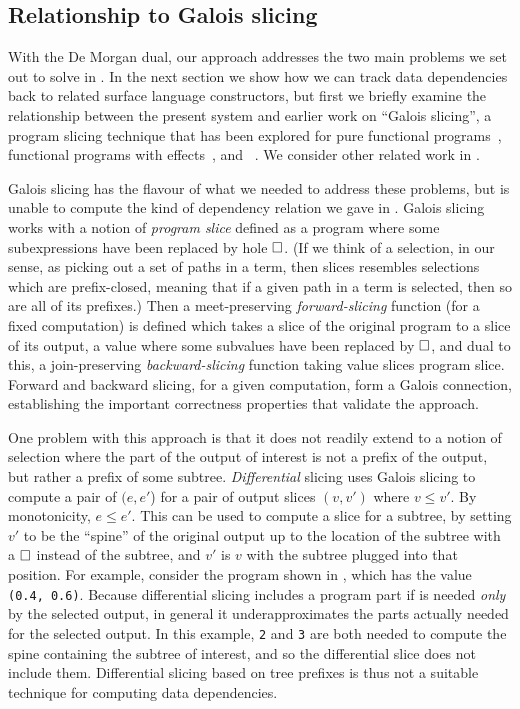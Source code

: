 \subsection{Relationship to Galois slicing}
\label{sec:de-morgan:galois-slicing}

With the De Morgan dual, our approach addresses the two main problems we set out to solve in . In the next section we show how we can track data dependencies back to related surface language constructors, but first we briefly examine the relationship between the present system and earlier work on ``Galois slicing'', a program slicing technique that has been explored for pure functional programs~\cite{perera12a}, functional programs with effects~\cite{ricciotti17}, and \piCalculus~\cite{perera16d}. We consider other related work in .



Galois slicing has the flavour of what we needed to address these problems, but is unable to compute the kind of dependency relation we gave in . Galois slicing works with a notion of \emph{program slice} defined as a program where some subexpressions have been replaced by hole $\square$. (If we think of a selection, in our sense, as picking out a set of paths in a term, then slices resembles selections which are prefix-closed, meaning that if a given path in a term is selected, then so are all of its prefixes.) Then a meet-preserving \emph{forward-slicing} function (for a fixed computation) is defined which takes a slice of the original program to a slice of its output, a value where some subvalues have been replaced by $\square$, and dual to this, a join-preserving \emph{backward-slicing} function taking value slices program slice. Forward and backward slicing, for a given computation, form a Galois connection, establishing the important correctness properties that validate the approach.

One problem with this approach is that it does not readily extend to a notion of selection where the part of the output of interest is not a prefix of the output, but rather a prefix of some subtree. \emph{Differential} slicing \cite{perera12a} uses Galois slicing to compute a pair of $(e,e'$) for a pair of output slices $(v,v')$ where $v \leq v'$. By monotonicity, $e \leq e'$. This can be used to compute a slice for a subtree, by setting $v'$ to be the ``spine'' of the original output up to the location of the subtree with a $\square$ instead of the subtree, and $v'$ is $v$ with the subtree plugged into that position. For example, consider the program shown in , which has the value \lstinline{(0.4, 0.6)}. Because differential slicing includes a program part if is needed \emph{only} by the selected output, in general it underapproximates the parts actually needed for the selected output. In this example, \lstinline{2} and \lstinline{3} are both needed to compute the spine containing the subtree of interest, and so the differential slice does not include them. Differential slicing based on tree prefixes is thus not a suitable technique for computing data dependencies.
